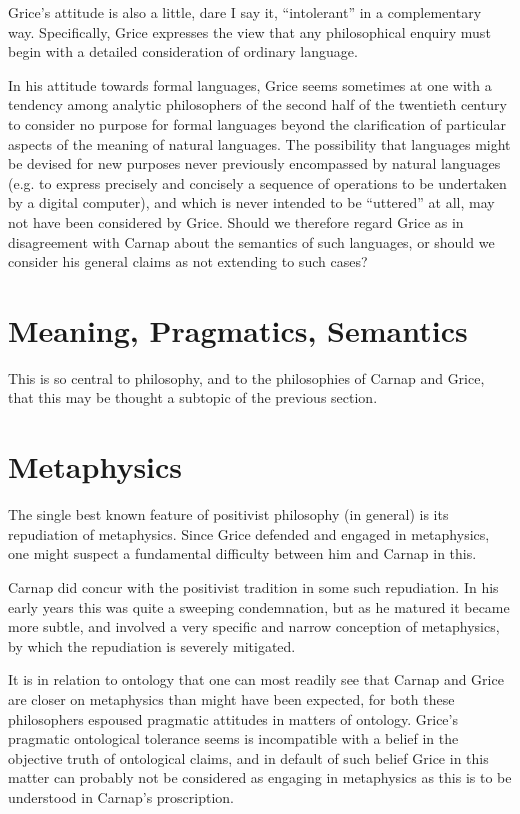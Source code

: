 \documentclass[10pt,titlepage]{book}
\begin{document}
Grice's attitude is also a little, dare I say it, ``intolerant'' in a complementary way.
Specifically, Grice expresses the view that any philosophical enquiry must begin with a detailed consideration of ordinary language.

In his attitude towards formal languages, Grice seems sometimes at one with a tendency among analytic philosophers of the second half of the twentieth century to consider no purpose for formal languages beyond the clarification of particular aspects of the meaning of natural languages.
The possibility that languages might be devised for new purposes never previously encompassed by natural languages (e.g. to express precisely and concisely a sequence of operations to be undertaken by a digital computer), and which is never intended to be ``uttered'' at all, may not have been considered by Grice.
Should we therefore regard Grice as in disagreement with Carnap about the semantics of such languages, or should we consider his general claims as not extending to such cases?

\section{Meaning, Pragmatics, Semantics}

This is so central to philosophy, and to the philosophies of Carnap and Grice, that this may be thought a subtopic of the previous section.

\section{Metaphysics}

The single best known feature of positivist philosophy (in general) is its repudiation of metaphysics.
Since Grice defended and engaged in metaphysics, one might suspect a fundamental difficulty between him and Carnap in this.

Carnap did concur with the positivist tradition in some such repudiation.
In his early years this was quite a sweeping condemnation, but as he matured it became more subtle, and involved a very specific and narrow conception of metaphysics, by which the repudiation is severely mitigated.

It is in relation to ontology that one can most readily see that Carnap and Grice are closer on metaphysics than might have been expected, for both these philosophers espoused pragmatic attitudes in matters of ontology.
Grice's pragmatic ontological tolerance seems is incompatible with a belief in the objective truth of ontological claims, and in default of such belief Grice in this matter can probably not be considered as engaging in metaphysics as this is to be understood in Carnap's proscription.
\end{document}
